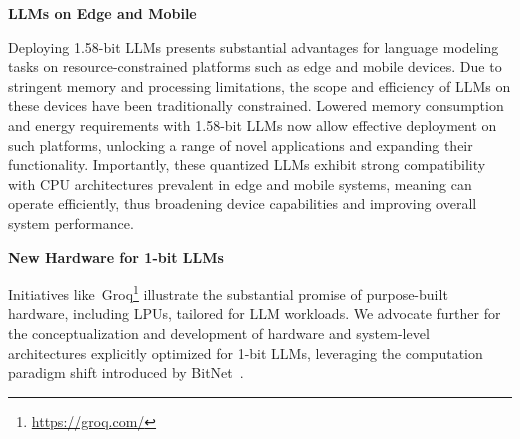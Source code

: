 \textbf{LLMs on Edge and Mobile}

Deploying 1.58-bit LLMs presents substantial advantages for language modeling tasks on resource-constrained platforms such as edge and mobile devices. Due to stringent memory and processing limitations, the scope and efficiency of LLMs on these devices have been traditionally constrained. Lowered memory consumption and energy requirements with 1.58-bit LLMs now allow effective deployment on such platforms, unlocking a range of novel applications and expanding their functionality. Importantly, these quantized LLMs exhibit strong compatibility with CPU architectures prevalent in edge and mobile systems, meaning  can operate efficiently, thus broadening device capabilities and improving overall system performance.

\textbf{New Hardware for 1-bit LLMs}

Initiatives like~Groq\footnote{\url{https://groq.com/}} illustrate the substantial promise of purpose-built hardware, including LPUs, tailored for LLM workloads. We advocate further for the conceptualization and development of hardware and system-level architectures explicitly optimized for 1-bit LLMs, leveraging the computation paradigm shift introduced by BitNet~\cite{bitnet}.